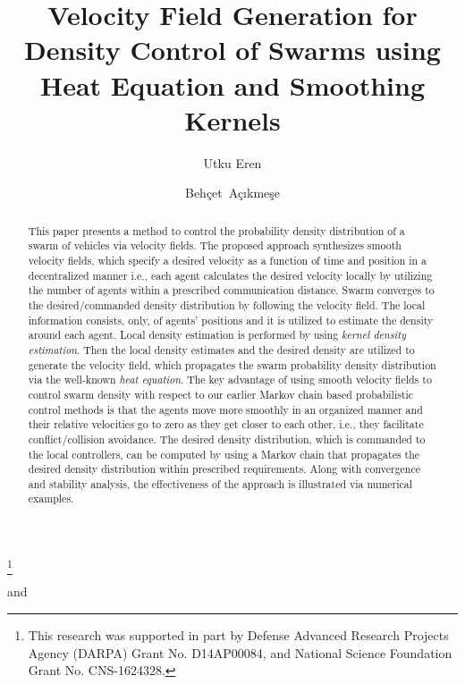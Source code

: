 \documentclass{ifacconf}
\begin{document}
\begin{frontmatter}

\title{Velocity Field Generation for Density Control of Swarms using Heat Equation and Smoothing Kernels} 

\thanks[footnoteinfo]{This research was supported in part by Defense Advanced Research Projects Agency (DARPA) Grant No. D14AP00084, and National Science Foundation Grant No. CNS-1624328.}

\author[First]{Utku Eren} and 
\author[Second]{Beh\c cet\ A\c c\i kme\c se} 

\address[First]{University of Washington, 
   Seattle, WA 98195 USA \\ (e-mail: ue@uw.edu).}
\address[Second]{University of Washington, 
   Seattle, WA 98195 USA \\ (e-mail: behcet@uw.edu).}

\begin{abstract}                %
	This paper presents a method to control the probability density distribution of a swarm of vehicles via velocity fields. The proposed approach synthesizes smooth velocity fields, which specify a desired velocity as a function of time and position in a  decentralized manner i.e., each agent calculates the desired velocity locally by utilizing the number of agents within a prescribed communication distance. Swarm converges to the desired/commanded density distribution by following the velocity field. The local information  consists, only, of agents' positions  and it is utilized to estimate the density around each agent. Local density estimation  is performed  by  using \emph{kernel density estimation}. Then the local density estimates and the desired density are utilized to generate the velocity field, which propagates the swarm probability density distribution  
via the well-known \emph{heat equation}. 
The key advantage of using smooth velocity fields to control swarm density with respect to our earlier Markov chain based probabilistic control methods is that the agents move more smoothly in an organized manner and their relative velocities go to zero as they get closer to each other, i.e., they facilitate conflict/collision avoidance.  The desired density distribution, which is commanded to the local controllers, can be computed by using a Markov chain that propagates  the desired density distribution within prescribed requirements. Along with convergence and stability analysis, the effectiveness of the approach is illustrated via numerical examples. 
\end{abstract}


\end{frontmatter}
\end{document}

